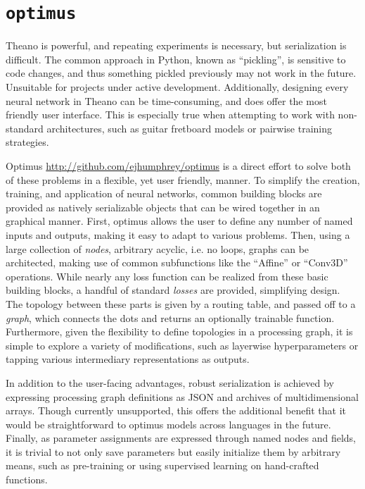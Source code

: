 \section{\texttt{optimus}}
\label{sec:optimus}

Theano is powerful, and repeating experiments is necessary, but serialization is difficult.
The common approach in Python, known as ``pickling'', is sensitive to code changes, and thus something pickled previously may not work in the future.
Unsuitable for projects under active development.
Additionally, designing every neural network in Theano can be time-consuming, and does offer the most friendly user interface.
This is especially true when attempting to work with non-standard architectures, such as guitar fretboard models or pairwise training strategies.

Optimus \url{http://github.com/ejhumphrey/optimus} is a direct effort to solve both of these problems in a flexible, yet user friendly, manner.
To simplify the creation, training, and application of neural networks, common building blocks are provided as natively serializable objects that can be wired together in an graphical manner.
First, optimus allows the user to define any number of named inputs and outputs, making it easy to adapt to various problems.
Then, using a large collection of \emph{nodes}, arbitrary acyclic, i.e. no loops, graphs can be architected, making use of common subfunctions like the ``Affine'' or ``Conv3D'' operations.
While nearly any loss function can be realized from these basic building blocks, a handful of standard \emph{losses} are provided, simplifying design.
The topology between these parts is given by a routing table, and passed off to a \emph{graph}, which connects the dots and returns an optionally trainable function.
Furthermore, given the flexibility to define topologies in a processing graph, it is simple to explore a variety of modifications, such as layerwise hyperparameters or tapping various intermediary representations as outputs.

In addition to the user-facing advantages, robust serialization is achieved by expressing processing graph definitions as JSON and archives of multidimensional arrays.
Though currently unsupported, this offers the additional benefit that it would be straightforward to optimus models across languages in the future.
Finally, as parameter assignments are expressed through named nodes and fields, it is trivial to not only save parameters but easily initialize them by arbitrary means, such as pre-training or using supervised learning on hand-crafted functions.


